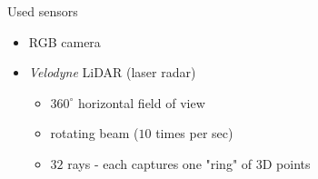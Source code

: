 \documentclass[pdf]{beamer}
\begin{document}
	\begin{frame}{Used sensors}
		\begin{itemize}
			\item RGB camera
			\item \emph{Velodyne} LiDAR (laser radar)
			\begin{itemize}
				\item $360^{\circ}$ horizontal field of view
				\item rotating beam ($10$ times per sec) 				
				\item $32$ rays - each captures one "ring" of $3$D points
			\end{itemize}
		\end{itemize}	
		\begin{figure}[h]
			\center
			\quad
			\quad
		\end{figure}
	\end{frame}
	
\end{document}
